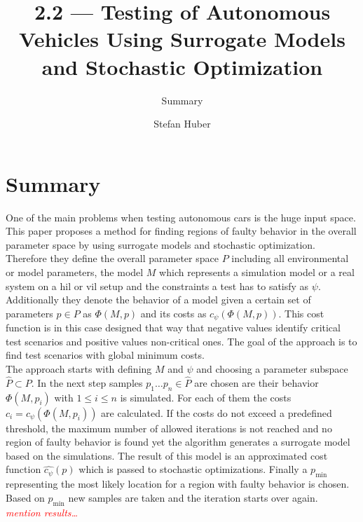 \documentclass[oneside, notitlepage, twocolumn]{scrartcl}
\title{\LARGE 2.2 --- Testing of Autonomous Vehicles Using Surrogate Models and Stochastic Optimization}
\subtitle{Summary}
\author{Stefan Huber}
\newcommand{\draft}[1]{\textcolor{red}{\textit{#1}}}
\begin{document}
\maketitle

\section{Summary}
One of the main problems when testing autonomous cars is the huge input space.
This paper proposes a method for finding regions of faulty behavior in the overall parameter space by using surrogate models and stochastic optimization.\\
Therefore they define the overall parameter space \(P\) including all environmental or model parameters, the model \(M\) which represents a simulation model or a real system on a \gls{hil} or \gls{vil} setup and the constraints a test has to satisfy as \(\psi\).
Additionally they denote the behavior of a model given a certain set of parameters \(p\in P\) as \(\Phi (M, p)\) and its costs as \(c_\psi(\Phi(M, p))\).
This cost function is in this case designed that way that negative values identify critical test scenarios and positive values non-critical ones.
The goal of the approach is to find test scenarios with global minimum costs.\\
The approach starts with defining \(M\) and \(\psi\) and choosing a parameter subspace \(\hat{P}\subset P\).
In the next step samples \(p_1\ldots p_n\in \hat{P}\) are chosen are their behavior \(\Phi (M, p_i)\) with \(1 \leq i \leq n\) is simulated.
For each of them the costs \(c_i=c_\psi(\Phi(M, p_i))\) are calculated.
If the costs do not exceed a predefined threshold, the maximum number of allowed iterations is not reached and no region of faulty behavior is found yet the algorithm generates a surrogate model based on the simulations.
The result of this model is an approximated cost function \(\hat{c_\psi}(p)\) which is passed to stochastic optimizations.
Finally a \(p_\min\) representing the most likely location for a region with faulty behavior is chosen.
Based on \(p_\min\) new samples are taken and the iteration starts over again.\\
\draft{mention results\ldots}
\end{document}
